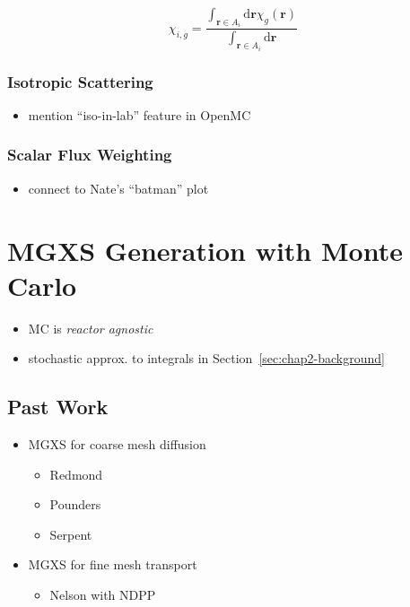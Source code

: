 \begin{equation}
\label{eqn:chap2-area-avg-chi}
\chi_{i,g} = \frac{\int_{\mathbf{r}\in A_{i}}\mathrm{d}\mathbf{r}\chi_{g}(\mathbf{r})}{\int_{\mathbf{r}\in A_{i}}\mathrm{d}\mathbf{r}}
\end{equation}


\subsubsection{Isotropic Scattering}
\label{subsubsec:chap2-iso-scatter}

\begin{itemize}
  \item mention ``iso-in-lab'' feature in OpenMC
\end{itemize}

\subsubsection{Scalar Flux Weighting}
\label{subsubsec:chap2-const-in-angle}

\begin{itemize}[noitemsep]
  \item connect to Nate's ``batman'' plot
\end{itemize}


\section{MGXS Generation with Monte Carlo}
\label{sec:chap2-mgxs-mc}

\begin{itemize}[noitemsep]
  \item \ac{MC} is \emph{reactor agnostic}
  \item stochastic approx. to integrals in Section~\ref{sec:chap2-background}
\end{itemize}

\subsection{Past Work}
\label{subsec:chap2-past-work}

\begin{itemize}[noitemsep]
  \item \ac{MGXS} for coarse mesh diffusion
  \begin{itemize}[noitemsep]
    \item Redmond
    \item Pounders
    \item Serpent
  \end{itemize}
  \item \ac{MGXS} for fine mesh transport
  \begin{itemize}[noitemsep]
    \item Nelson with NDPP
  \end{itemize}
\end{itemize}

